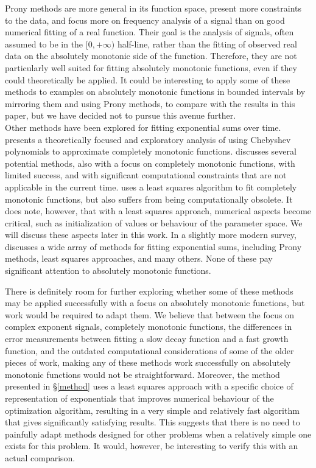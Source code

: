 \documentclass[12pt,a4paper]{article}
\begin{document}
Prony methods are more general in its function space, present more constraints to the data, and focus more on frequency analysis of a signal than on good numerical fitting of a real function. Their goal is the analysis of signals, often assumed to be in the $[0,+\infty)$ half-line, rather than the fitting of observed real data on the absolutely monotonic side of the function. Therefore, they are not particularly well suited for fitting absolutely monotonic functions, even if they could theoretically be applied. It could be interesting to apply some of these methods to examples on absolutely monotonic functions in bounded intervals by mirroring them and using Prony methods, to compare with the results in this paper, but we have decided not to pursue this avenue further.\\

Other methods have been explored for fitting exponential sums over time. \cite{1976_kammler_approximation_completely_monotonic} presents a theoretically focused and exploratory analysis of using Chebyshev polynomials to approximate completely monotonic functions. \cite{1976_smith_decomposition_exponential_decays} discusses several potential methods, also with a focus on completely monotonic functions, with limited success, and with significant computational constraints that are not applicable in the current time. \cite{1980_evans_least_squares_exponential_sum} uses a least squares algorithm to fit completely monotonic functions, but also suffers from being computationally obsolete. It does note, however, that with a least squares approach, numerical aspects become critical, such as initialization of values or behaviour of the parameter space. We will discuss these aspects later in this work. In a slightly more modern survey, \cite{2002_holmstr_parameter_estimation_fitting_exponentials} discusses a wide array of methods for fitting exponential sums, including Prony methods, least squares approaches, and many others. None of these pay significant attention to absolutely monotonic functions.

There is definitely room for further exploring whether some of these methods may be applied successfully with a focus on absolutely monotonic functions, but work would be required to adapt them. We believe that between the focus on complex exponent signals, completely monotonic functions, the differences in error measurements between fitting a slow decay function and a fast growth function, and the outdated computational considerations of some of the older pieces of work, making any of these methods work successfully on absolutely monotonic functions would not be straightforward. Moreover, the method presented in \S \ref{method} uses a least squares approach with a specific choice of representation of exponentials that improves numerical behaviour of the optimization algorithm, resulting in a very simple and relatively fast algorithm that gives significantly satisfying results. This suggests that there is no need to painfully adapt methods designed for other problems when a relatively simple one exists for this problem. It would, however, be interesting to verify this with an actual comparison.
\end{document}
